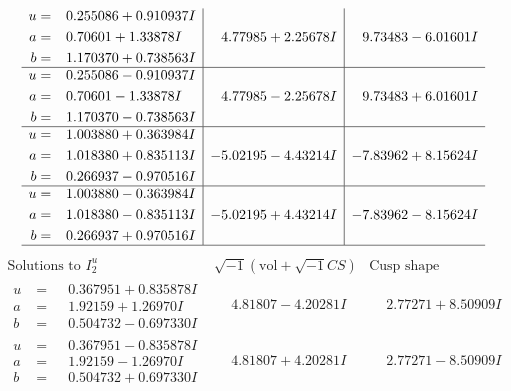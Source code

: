 \documentclass[1p]{elsarticle_modified}
\theoremstyle{definition}
\newcommand{\I}{\sqrt{-1}}
\begin{document}
$$\begin{array}{c|c|c}
\begin{aligned}
u &= \phantom{-}0.255086 + 0.910937 I \\
a &= \phantom{-}0.70601 + 1.33878 I \\
b &= \phantom{-}1.170370 + 0.738563 I\end{aligned}
 & \phantom{-}4.77985 + 2.25678 I & \phantom{-}9.73483 - 6.01601 I \\ \hline\begin{aligned}
u &= \phantom{-}0.255086 - 0.910937 I \\
a &= \phantom{-}0.70601 - 1.33878 I \\
b &= \phantom{-}1.170370 - 0.738563 I\end{aligned}
 & \phantom{-}4.77985 - 2.25678 I & \phantom{-}9.73483 + 6.01601 I \\ \hline\begin{aligned}
u &= \phantom{-}1.003880 + 0.363984 I \\
a &= \phantom{-}1.018380 + 0.835113 I \\
b &= \phantom{-}0.266937 - 0.970516 I\end{aligned}
 & -5.02195 - 4.43214 I & -7.83962 + 8.15624 I \\ \hline\begin{aligned}
u &= \phantom{-}1.003880 - 0.363984 I \\
a &= \phantom{-}1.018380 - 0.835113 I \\
b &= \phantom{-}0.266937 + 0.970516 I\end{aligned}
 & -5.02195 + 4.43214 I & -7.83962 - 8.15624 I\\
 \hline 
 \end{array}$$\newpage$$\begin{array}{c|c|c}  
\text{Solutions to }I^u_{2}& \I (\text{vol} + \sqrt{-1}CS) & \text{Cusp shape}\\
 \hline 
\begin{aligned}
u &= \phantom{-}0.367951 + 0.835878 I \\
a &= \phantom{-}1.92159 + 1.26970 I \\
b &= \phantom{-}0.504732 - 0.697330 I\end{aligned}
 & \phantom{-}4.81807 - 4.20281 I & \phantom{-}2.77271 + 8.50909 I \\ \hline\begin{aligned}
u &= \phantom{-}0.367951 - 0.835878 I \\
a &= \phantom{-}1.92159 - 1.26970 I \\
b &= \phantom{-}0.504732 + 0.697330 I\end{aligned}
 & \phantom{-}4.81807 + 4.20281 I & \phantom{-}2.77271 - 8.50909 I \\ \hline\begin{aligned}

\end{aligned}
\end{array}$$
\end{document}
